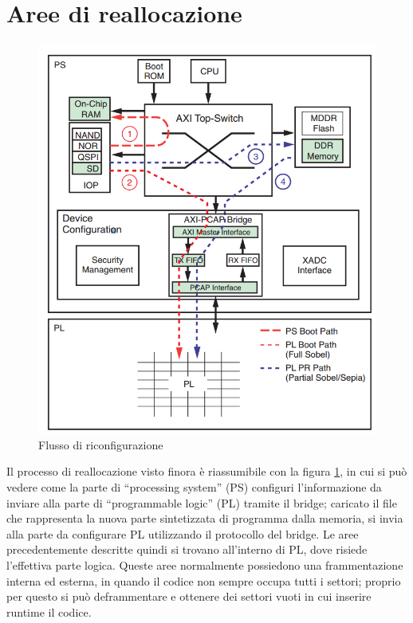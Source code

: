 \documentclass[a4paper,titlepage]{book}
\begin{document}
\section{Aree di reallocazione}

\begin{figure}
\centering
\includegraphics[scale=0.5]{protocollo_riconfigurazione.png}
\caption{Flusso di riconfigurazione}\label{fig:2}
\end{figure}

Il processo di reallocazione visto finora è riassumibile con la figura \ref{fig:2}, in cui si può vedere come la parte di  ``processing system'' (PS) configuri l'informazione da inviare alla parte di ``programmable logic'' (PL) tramite il bridge; caricato il file che rappresenta la nuova parte sintetizzata di programma dalla memoria, si invia alla parte da configurare PL utilizzando il protocollo del bridge.
Le aree precedentemente descritte quindi si trovano all'interno di PL, dove risiede l'effettiva parte logica. Queste aree normalmente possiedono una frammentazione interna ed esterna, in quando il codice non sempre occupa tutti i settori; proprio per questo si può deframmentare e ottenere dei settori vuoti in cui inserire runtime il codice.
\end{document}
